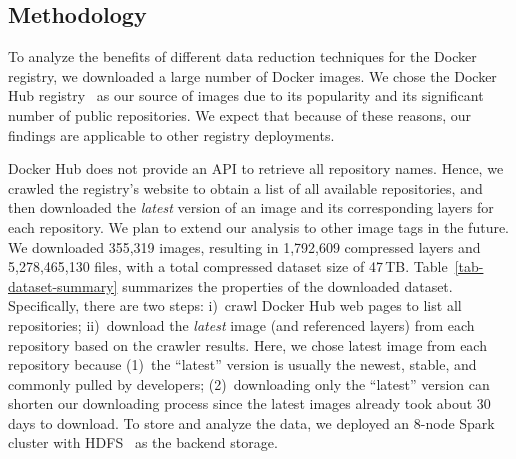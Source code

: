 \subsection{Methodology}
\label{sec:methodology}



To analyze the benefits of different data reduction techniques for the Docker registry,
we downloaded a large number of Docker images.
%
We chose the Docker Hub registry~\cite{docker-hub} as our source of images
due to its popularity and its significant number
of public repositories.
%
We expect that because of these reasons, our findings are applicable to other
registry deployments.

Docker Hub does not provide an API to retrieve all repository names.
Hence, we crawled the registry's website to obtain a list of all available
repositories, and then downloaded the \emph{latest} version of an image and its
corresponding layers for each repository.
%
We plan to extend our analysis to other image tags in the future.
%
We downloaded 355,319 images, resulting in 1,792,609 compressed layers
and 5,278,465,130 files, with a total compressed dataset size of 47\,TB.
Table~\ref{tab-dataset-summary} summarizes the properties of the downloaded
dataset.
%
Specifically, there are two steps: i)~crawl Docker Hub web pages to list all
repositories; ii)~download the \textit{latest} image (and referenced layers)
from each repository based on the crawler results.
%
Here, we chose latest image from each repository because (1)~the ``latest''
version is usually the newest, stable, and commonly pulled by developers;
(2)~downloading only the ``latest'' version can shorten our downloading
process since the latest images already took about 30 days to download.
%
To store and analyze the data, we deployed an 8-node Spark~\cite{spark}
cluster with HDFS~\cite{hdfs} as the backend storage.
%
%
%
%
%
